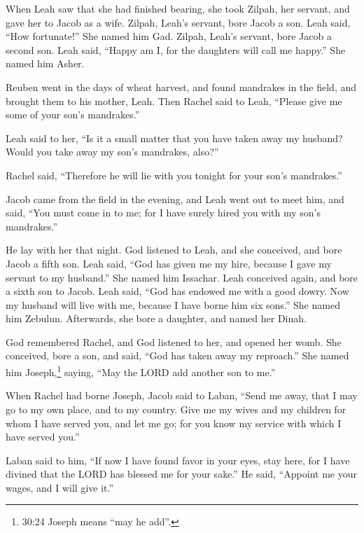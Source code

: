 \myverse{}When Leah saw that she had finished bearing, she took Zilpah, her servant, and gave her to Jacob as a wife.  \myverse{}Zilpah, Leah’s servant, bore Jacob a son.  \myverse{}Leah said, “How fortunate!” She named him Gad.  \myverse{}Zilpah, Leah’s servant, bore Jacob a second son.  \myverse{}Leah said, “Happy am I, for the daughters will call me happy.” She named him Asher.

\myverse{}Reuben went in the days of wheat harvest, and found mandrakes in the field, and brought them to his mother, Leah. Then Rachel said to Leah, “Please give me some of your son’s mandrakes.”

\myverse{}Leah said to her, “Is it a small matter that you have taken away my husband? Would you take away my son’s mandrakes, also?”

Rachel said, “Therefore he will lie with you tonight for your son’s mandrakes.”

\myverse{}Jacob came from the field in the evening, and Leah went out to meet him, and said, “You must come in to me; for I have surely hired you with my son’s mandrakes.”

He lay with her that night.  \myverse{}God listened to Leah, and she conceived, and bore Jacob a fifth son.  \myverse{}Leah said, “God has given me my hire, because I gave my servant to my husband.” She named him Issachar.  \myverse{}Leah conceived again, and bore a sixth son to Jacob.  \myverse{}Leah said, “God has endowed me with a good dowry. Now my husband will live with me, because I have borne him six sons.” She named him Zebulun.  \myverse{}Afterwards, she bore a daughter, and named her Dinah.

\myverse{}God remembered Rachel, and God listened to her, and opened her womb.  \myverse{}She conceived, bore a son, and said, “God has taken away my reproach.” \myverse{}She named him Joseph,\footnote{30:24 Joseph means “may he add”.} saying, “May the LORD add another son to me.”

\myverse{}When Rachel had borne Joseph, Jacob said to Laban, “Send me away, that I may go to my own place, and to my country.  \myverse{}Give me my wives and my children for whom I have served you, and let me go; for you know my service with which I have served you.”

\myverse{}Laban said to him, “If now I have found favor in your eyes, stay here, for I have divined that the LORD has blessed me for your sake.”  \myverse{}He said, “Appoint me your wages, and I will give it.”

